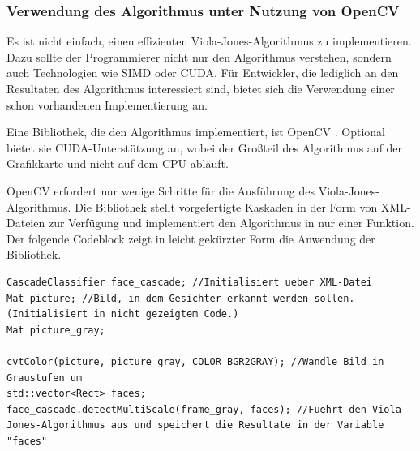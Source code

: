 \documentclass[doktyp=semarbeit, sprache=german]{TUBAFarbeiten}
\begin{document}
\subsubsection{Verwendung des Algorithmus unter Nutzung von OpenCV}
Es ist nicht einfach, einen effizienten Viola-Jones-Algorithmus zu implementieren. Dazu sollte der Programmierer nicht nur den Algorithmus verstehen, sondern auch Technologien wie SIMD oder CUDA. Für Entwickler, die lediglich an den Resultaten des Algorithmus interessiert sind, bietet sich die Verwendung einer schon vorhandenen Implementierung an.

Eine Bibliothek, die den Algorithmus implementiert, ist OpenCV \cite{opencv_library}. Optional bietet sie CUDA-Unterstützung an, wobei der Großteil des Algorithmus auf der Grafikkarte und nicht auf dem CPU abläuft.

OpenCV erfordert nur wenige Schritte für die Ausführung des Viola-Jones-Algorithmus. Die Bibliothek stellt vorgefertigte Kaskaden in der Form von XML-Dateien zur Verfügung und implementiert den Algorithmus in nur einer Funktion. Der folgende Codeblock zeigt in leicht gekürzter Form die Anwendung der Bibliothek.

\begin{lstlisting}
CascadeClassifier face_cascade; //Initialisiert ueber XML-Datei
Mat picture; //Bild, in dem Gesichter erkannt werden sollen. (Initialisiert in nicht gezeigtem Code.)
Mat picture_gray;

cvtColor(picture, picture_gray, COLOR_BGR2GRAY); //Wandle Bild in Graustufen um
std::vector<Rect> faces;
face_cascade.detectMultiScale(frame_gray, faces); //Fuehrt den Viola-Jones-Algorithmus aus und speichert die Resultate in der Variable "faces"
\end{lstlisting}
\end{document}
